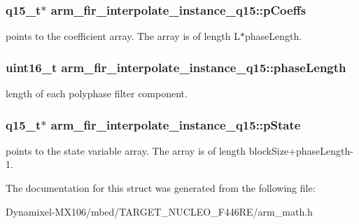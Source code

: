 \subsubsection[{\texorpdfstring{p\+Coeffs}{pCoeffs}}]{\setlength{\rightskip}{0pt plus 5cm}q15\+\_\+t$\ast$ arm\+\_\+fir\+\_\+interpolate\+\_\+instance\+\_\+q15\+::p\+Coeffs}\hypertarget{structarm__fir__interpolate__instance__q15_a767d91d61d4c0beeddd4325d28d28e24}{}\label{structarm__fir__interpolate__instance__q15_a767d91d61d4c0beeddd4325d28d28e24}
points to the coefficient array. The array is of length L$\ast$phase\+Length. 
\subsubsection[{\texorpdfstring{phase\+Length}{phaseLength}}]{\setlength{\rightskip}{0pt plus 5cm}uint16\+\_\+t arm\+\_\+fir\+\_\+interpolate\+\_\+instance\+\_\+q15\+::phase\+Length}\hypertarget{structarm__fir__interpolate__instance__q15_ad5178a02a697a77e0d0e60705d9f0a19}{}\label{structarm__fir__interpolate__instance__q15_ad5178a02a697a77e0d0e60705d9f0a19}
length of each polyphase filter component. 
\subsubsection[{\texorpdfstring{p\+State}{pState}}]{\setlength{\rightskip}{0pt plus 5cm}q15\+\_\+t$\ast$ arm\+\_\+fir\+\_\+interpolate\+\_\+instance\+\_\+q15\+::p\+State}\hypertarget{structarm__fir__interpolate__instance__q15_a26b864363fa47954248f2590e3a82a3c}{}\label{structarm__fir__interpolate__instance__q15_a26b864363fa47954248f2590e3a82a3c}
points to the state variable array. The array is of length block\+Size+phase\+Length-\/1. 

The documentation for this struct was generated from the following file\+:\begin{DoxyCompactItemize}
\item 
Dynamixel-\/\+M\+X106/mbed/\+T\+A\+R\+G\+E\+T\+\_\+\+N\+U\+C\+L\+E\+O\+\_\+\+F446\+R\+E/arm\+\_\+math.\+h\end{DoxyCompactItemize}
